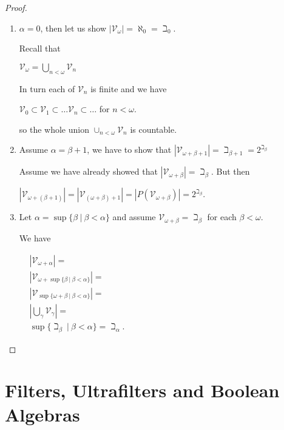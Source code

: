 \documentclass[8pt]{article}
\theoremstyle{definition}
\theoremstyle{definition}
\theoremstyle{definition}
\theoremstyle{definition}
\theoremstyle{definition}
\theoremstyle{definition}
\theoremstyle{definition}
\theoremstyle{definition}
\theoremstyle{definition}
\theoremstyle{definition}
\theoremstyle{definition}
\theoremstyle{definition}
\theoremstyle{definition}
\theoremstyle{definition}
\theoremstyle{question}
\begin{document}
\begin{proof}

  \begin{enumerate}
    \item $\alpha = 0$, then let us show $|\mathcal{V}_{\omega}| = \aleph_0 = \beth_0$.

    Recall that 
    \begin{center}
      $\mathcal{V}_{\omega} = \bigcup \limits_{n < \omega} \mathcal{V}_n$
    \end{center}
    In turn each of $\mathcal{V}_n$ is finite and we have
    \begin{center}
      $\mathcal{V}_0 \subset \mathcal{V}_1 \subset \dots \mathcal{V}_n \subset \dots$ for $n < \omega$.
    \end{center}
    so the whole union $\cup_{n < \omega} \mathcal{V}_n$ is countable.
    \item Assume $\alpha = \beta + 1$, we have to show that $|\mathcal{V}_{\omega + \beta + 1}| = \beth_{\beta + 1} = 2^{\beth_{\beta}}$

    Assume we have already showed that $|\mathcal{V}_{\omega + \beta}| = \beth_{\beta}$. But then
    
    \begin{center}
    $|\mathcal{V}_{\omega + (\beta + 1)}| = |\mathcal{V}_{(\omega + \beta) + 1}| = |P(\mathcal{V}_{\omega + \beta})| = 2^{\beth_{\beta}}$.
    \end{center}
    \item Let $\alpha = \sup \{\beta \: | \: \beta < \alpha \}$
    and assume $\mathcal{V}_{\omega + \beta} = \beth_{\beta}$ for each $\beta < \omega$.

    We have

    $\begin{array}{lll}
      & |\mathcal{V}_{\omega + \alpha}| = & \\
      & |\mathcal{V}_{\omega + \sup \{ \beta \: | \: \beta < \alpha\}}| = & \\
      & |\mathcal{V}_{\sup \{ \omega + \beta \: | \: \beta < \alpha \}} |= & \\
      & |\bigcup \limits_{\gamma} \mathcal{V}_{\gamma} | = & \\
      & \sup \{ \beth_{\beta} \: | \: \beta < \alpha\} = \beth_{\alpha}.&
    \end{array}$
  \end{enumerate}
\end{proof}


\section{Filters, Ultrafilters and Boolean Algebras}



\end{document}
